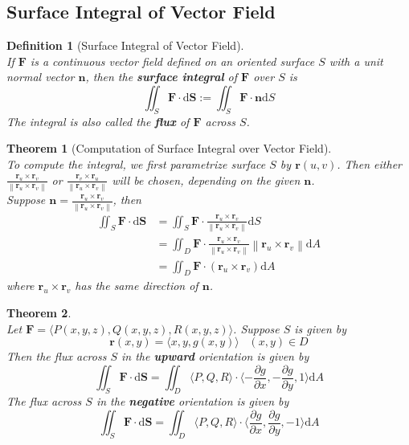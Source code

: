 \documentclass[12pt]{article}
\newcommand\norm[1]{\left\lVert#1\right\rVert}
\newtheorem{definition}{Definition}[section]
\newtheorem{theorem}{Theorem}[section]
\theoremstyle{definition}
\newcommand{\diff}{\mathrm{d}}
\begin{document}
\subsection{Surface Integral of Vector Field}
\begin{definition}[Surface Integral of Vector Field]
\hfill\\\normalfont If $\mathbf{F}$ is a continuous vector field defined on an oriented surface $S$ with a unit normal vector $\mathbf{n}$, then the \textbf{surface integral} of $\mathbf{F}$ over $S$ is
\[
\iint_S\mathbf{F}\cdot\diff\mathbf{S}:=\iint_S\mathbf{F}\cdot\mathbf{n}\diff S
\]
The integral is also called the \textbf{flux} of $\mathbf{F}$ across $S$.
\end{definition}
\begin{theorem}[Computation of Surface Integral over Vector Field]\hfill\\\normalfont
To compute the integral, we first parametrize surface $S$ by $\mathbf{r}(u,v)$. Then either $\frac{\mathbf{r}_u\times \mathbf{r}_v}{\norm{\mathbf{r}_u\times \mathbf{r}_v}}$ or $\frac{\mathbf{r}_v\times\mathbf{r}_u}{\norm{\mathbf{r}_u\times \mathbf{r}_v}}$ will be chosen, depending on the given $\mathbf{n}$. \\Suppose $\mathbf{n}=\frac{\mathbf{r}_u\times \mathbf{r}_v}{\norm{\mathbf{r}_u\times \mathbf{r}_v}}$, then
\begin{align*}
\iint_S\mathbf{F}\cdot\diff \mathbf{S}&=\iint_S\mathbf{F}\cdot\frac{\mathbf{r}_u\times \mathbf{r}_v}{\norm{\mathbf{r}_u\times \mathbf{r}_v}}\diff S\\
&=\iint_D \mathbf{F}\cdot \frac{\mathbf{r}_u\times \mathbf{r}_v}{\norm{\mathbf{r}_u\times \mathbf{r}_v}}\norm{\mathbf{r}_u\times \mathbf{r}_v}\diff A\\
&=\iint_D\mathbf{F}\cdot(\mathbf{r}_u\times\mathbf{r}_v)\diff A
\end{align*}
where $\mathbf{r}_u\times\mathbf{r}_v$ has the same direction of $\mathbf{n}$.
\end{theorem}
\begin{theorem}\hfill\\\normalfont
Let $\mathbf{F}=\langle P(x,y,z),Q(x,y,z),R(x,y,z) \rangle$. Suppose $S$ is given by
\[
\mathbf{r}(x,y)=\langle x,y,g(x,y)\rangle\;\;\;(x,y)\in D
\]
Then the flux across $S$ in the \textbf{upward} orientation is given by
\[
\iint_S\mathbf{F}\cdot\diff\mathbf{S}=\iint_D\langle P,Q,R\rangle \cdot\langle-\frac{\partial g}{\partial x},-\frac{\partial g}{\partial y}, 1 \rangle\diff A
\]
The flux across $S$ in the \textbf{negative} orientation is given by
\[
\iint_S\mathbf{F}\cdot\diff\mathbf{S}=\iint_D\langle P,Q,R\rangle \cdot\langle\frac{\partial g}{\partial x},\frac{\partial g}{\partial y}, -1 \rangle\diff A
\]
\end{theorem}
\end{document}
